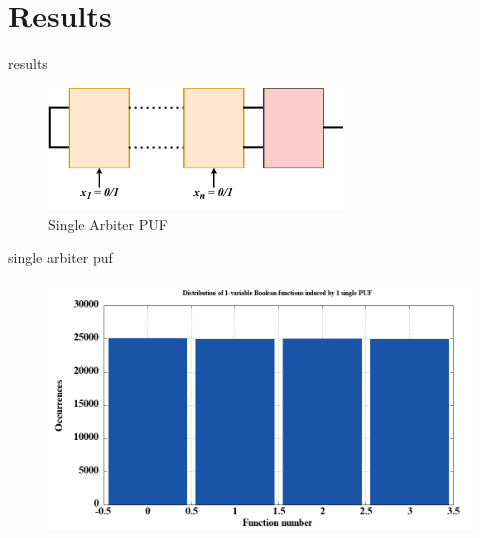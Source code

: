 \documentclass[10pt, compress]{beamer}
\begin{document}
\section{Results}


\begin{frame}{results}
    \begin{figure}
        \centering
        \includegraphics[width=0.7\textwidth]{figures/puf_1.pdf}
        \caption{Single Arbiter PUF}
    \end{figure}
\end{frame}

\begin{frame}{single arbiter puf}
    \begin{figure}
        \centering
        \includegraphics[width=\textwidth]{figures/dist/distribution_of_1-variable_boolean_functions_induced_by_1_single_puf.png}
    \end{figure}
\end{frame}
\end{document}
